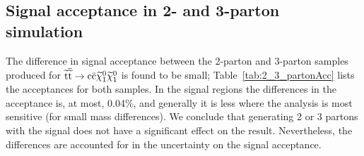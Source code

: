 \subsection{Signal acceptance in 2- and 3-parton simulation}

The difference in signal acceptance between the 2-parton and 3-parton samples produced for $\widetilde{{\rm t}} \overline{\widetilde{\mathrm{t}}} \rightarrow \rm c \bar{\rm c} \widetilde{\chi}^{0}_{1} \widetilde{\chi}^{0}_{1}$ 
is found to be small; Table~\ref{tab:2_3_partonAcc} lists the acceptances for both samples.
In the signal regions the differences in the acceptance is, at most, 0.04\%, 
and generally it is less where the analysis is most sensitive (for small mass differences).
We conclude that generating 2 or 3 partons with the signal does not have a significant effect on the result.
Nevertheless, the differences are accounted for in the uncertainty on the signal acceptance.

